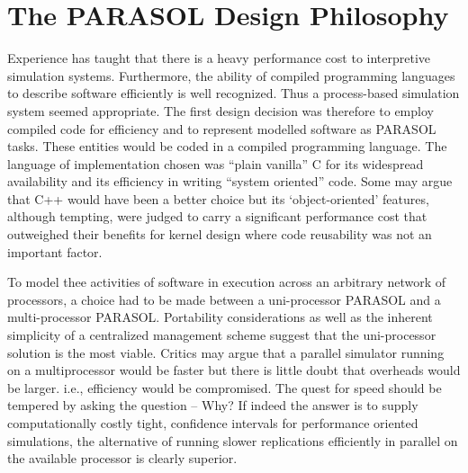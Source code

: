 \documentclass[11pt]{article}
\begin{document}
\section{The PARASOL Design Philosophy}
\label{sec:design}

Experience has taught that there is a heavy performance cost to interpretive simulation systems.
Furthermore, the ability of compiled programming languages to describe software efficiently is
well recognized. Thus a process-based simulation system seemed appropriate. The first design
decision was therefore to employ compiled code for efficiency and to represent modelled software
as PARASOL tasks. These entities would be coded in a compiled programming language. The
language of implementation chosen was ``plain vanilla'' C for its widespread availability and its
efficiency in writing ``system oriented'' code. Some may argue that C++ would have been a better
choice but its `object-oriented' features, although tempting, were judged to carry a significant
performance cost that outweighed their benefits for kernel design where code reusability was not
an important factor.

To model thee activities of software in execution across an arbitrary network of processors, a choice
had to be made between a uni-processor PARASOL and a multi-processor PARASOL. Portability
considerations as well as the inherent simplicity of a centralized management scheme suggest that
the uni-processor solution is the most viable. Critics may argue that a parallel simulator running on
a multiprocessor would be faster but there is little doubt that overheads would be larger. i.e.,
efficiency would be compromised. The quest for speed should be tempered by asking the question
-- Why? If indeed the answer is to supply computationally costly tight, confidence intervals for
performance oriented simulations, the alternative of running slower replications efficiently in
parallel on the available processor is clearly superior.
\end{document}

